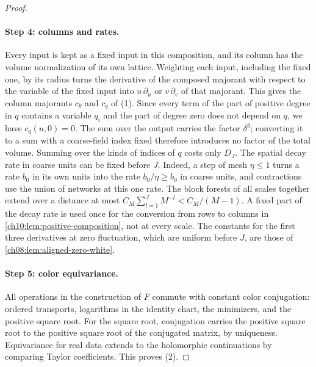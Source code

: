 \begin{proof}
\paragraph{Step 4: columns and rates.}
Every input is kept as a fixed input in this composition, and its column has the volume normalization of its own lattice. Weighting each input, including the fixed one, by its radius turns the derivative of the composed majorant with respect to the variable of the fixed input into $u\,\partial_u$ or $v\,\partial_v$ of that majorant. This gives the column majorants $c_\theta$ and $c_q$ of (1). Since every term of the part of positive degree in $q$ contains a variable $q_i$ and the part of degree zero does not depend on $q$, we have $c_q(u,0)=0$. The sum over the output carries the factor $\delta^3$; converting it to a sum with a coarse-field index fixed therefore introduces no factor of the total volume. Summing over the kinds of indices of $q$ costs only $D_J$. The spatial decay rate in coarse units can be fixed before $J$. Indeed, a step of mesh $\eta\le1$ turns a rate $b_0$ in its own units into the rate $b_0/\eta\ge b_0$ in coarse units, and contractions use the union of networks at this one rate. The block forests of all scales together extend over a distance at most $C_M\sum_{l=1}^JM^{-l}<C_M/(M-1)$. A fixed part of the decay rate is used once for the conversion from rows to columns in \cref{ch10:lem:positive-composition}, not at every scale. The constants for the first three derivatives at zero fluctuation, which are uniform before $J$, are those of \cref{ch08:lem:aligned-zero-white}.

\paragraph{Step 5: color equivariance.}
All operations in the construction of $F$ commute with constant color conjugation: ordered transports, logarithms in the identity chart, the minimizers, and the positive square root. For the square root, conjugation carries the positive square root to the positive square root of the conjugated matrix, by uniqueness. Equivariance for real data extends to the holomorphic continuations by comparing Taylor coefficients. This proves (2).


\end{proof}
